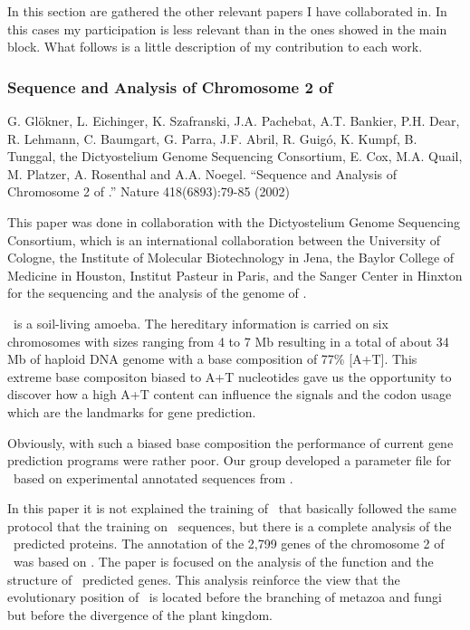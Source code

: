 
In this section are gathered the other relevant papers I have
collaborated in. In this cases my participation is less relevant than
in the ones showed in the main block. What follows is a little
description of my contribution to each work.


\subsubsection{Sequence and Analysis of Chromosome 2 of \DdL}
G. Gl\"okner, L. Eichinger, K. Szafranski, J.A. Pachebat,
A.T. Bankier, P.H. Dear, R. Lehmann, C. Baumgart, G. Parra,
J.F. Abril, R. Guig\'o, K. Kumpf, B. Tunggal, the Dictyostelium Genome
Sequencing Consortium, E. Cox, M.A. Quail, M. Platzer, A. Rosenthal
and A.A. Noegel.  ``Sequence and Analysis of Chromosome 2 of
\DdL.''  Nature 418(6893):79-85 (2002)


This paper was done in collaboration with the Dictyostelium Genome
Sequencing Consortium, which is an international collaboration between
the University of Cologne, the Institute of Molecular Biotechnology in
Jena, the Baylor College of Medicine in Houston, Institut Pasteur in
Paris, and the Sanger Center in Hinxton for the sequencing and the
analysis of the genome of \Dd. 

\Dd\ is a soil-living amoeba. The hereditary information is carried
on six chromosomes with sizes ranging from 4 to 7 Mb resulting in a
total of about 34 Mb of haploid DNA genome with a base composition of
77\% [A+T]. This extreme base compositon biased to A+T nucleotides
gave us the opportunity to discover how a high A+T content can
influence the signals and the codon usage which are the landmarks for
gene prediction.

Obviously, with such a biased base composition the performance of
current gene prediction programs were rather poor. Our group developed
a parameter file for \geneid\ based on experimental annotated
sequences from \Dd.

In this paper it is not explained the training of \geneid\ that
basically followed the same protocol that the training on \Dm\
sequences, but there is a complete analysis of the \geneid\ predicted
proteins. The annotation of the 2,799 genes of the chromosome 2 of
\Dd\ was based on \geneid. The paper is focused on the analysis of
the function and the structure of \geneid\ predicted genes. This
analysis reinforce the view that the evolutionary position of \Dd\
is located before the branching of metazoa and fungi but before the
divergence of the plant kingdom.


